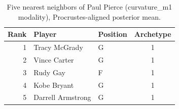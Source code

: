 \begin{table}[htbp]
  \centering\small
  \begin{tabular}{rllc}
    \toprule
    Rank & Player & Position & Archetype \\
    \midrule
    1 & Tracy McGrady & G & 1 \\
    2 & Vince Carter & G & 1 \\
    3 & Rudy Gay & F & 1 \\
    4 & Kobe Bryant & G & 1 \\
    5 & Darrell Armstrong & G & 1 \\
    \bottomrule
  \end{tabular}
  \caption{Five nearest neighbors of Paul Pierce (curvature_m1 modality), Procrustes-aligned posterior mean.}
  \label{tab:Paul_Pierce_neighbors_curvature_m1}
\end{table}


